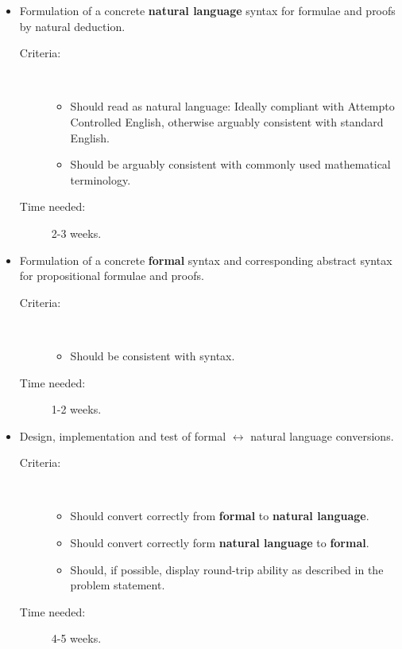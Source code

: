 \documentclass[a4paper]{article}
\begin{document}
\begin{itemize}
\item 
    Formulation of a concrete {\bf natural language} syntax for formulae and
    proofs by natural deduction.
    \begin{description}
        \item[Criteria:]~ \\ \vspace{-5 mm}
            \begin{itemize}
                \item Should read as natural language: Ideally compliant
                with Attempto Controlled English, otherwise arguably
                consistent with standard English.
                \item Should be arguably consistent with commonly used 
                mathematical terminology.
            \end{itemize}
        \item[Time needed:] 2-3 weeks.
    \end{description}

\item
    Formulation of a concrete {\bf formal} syntax and corresponding abstract
    syntax for propositional formulae and proofs.
    \begin{description}
        \item[Criteria:]~ \\ \vspace{-5 mm}
            \begin{itemize}
                \item Should be consistent with \cite{box}
                syntax.
            \end{itemize}
        \item[Time needed:] 1-2 weeks.
    \end{description}

\item
    Design, implementation and test of formal $\longleftrightarrow$ natural
    language conversions.
    \begin{description}
        \item[Criteria:]~ \\ \vspace{-5 mm}
            \begin{itemize}
                \item Should convert correctly from {\bf formal} to
                {\bf natural language}.
                \item Should convert correctly form {\bf natural language}
                to {\bf formal}.
                \item Should, if possible, display round-trip ability as
                described in the problem statement.
            \end{itemize}
        \item[Time needed:] 4-5 weeks.
    \end{description}


\end{itemize}
\end{document}
